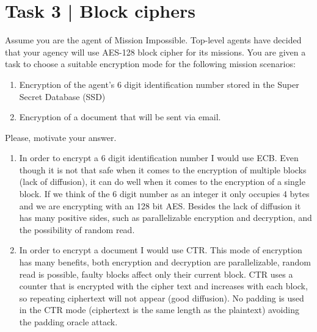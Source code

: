 \documentclass{article}
\begin{document}
\section*{Task 3 | Block ciphers}
Assume you are the agent of Mission Impossible. Top-level agents have decided that your
agency will use AES-128 block cipher for its missions. You are given a task to choose a 
suitable encryption mode for the following mission scenarios:
\begin{enumerate}
    \item Encryption of the agent's 6 digit identification number stored in the 
        Super Secret Database (SSD)
    \item Encryption of a document that will be sent via email.
\end{enumerate}
Please, motivate your answer.
\begin{enumerate}
    \item In order to encrypt a 6 digit identification number I would use ECB. Even though
        it is not that safe when it comes to the encryption of multiple blocks (lack of diffusion), 
        it can do well when it comes to the encryption of a single block. If we think of the 6 digit
        number as an integer it only occupies 4 bytes and we are encrypting with an 128 bit
        AES. Besides the lack of diffusion it has many positive sides, such as parallelizable
        encryption and decryption, and the possibility of random read.
    \item In order to encrypt a document I would use CTR. This mode of encryption has 
        many benefits, both encryption and decryption are parallelizable, random read is possible,
        faulty blocks affect only their current block.
        CTR uses a counter that is encrypted with the cipher text and increases 
        with each block, so repeating ciphertext will not appear (good diffusion). No padding is used 
        in the CTR mode (ciphertext is the same length as the plaintext) avoiding the padding oracle attack.
\end{enumerate}
\end{document}

